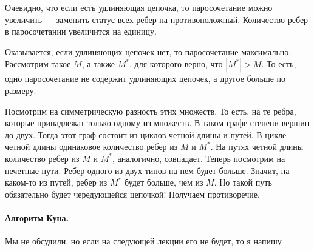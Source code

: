 \documentclass[12pt]{article}
\begin{document}
Очевидно, что если есть удлиняющая цепочка, то паросочетание можно увеличить --- заменить статус всех ребер на противоположный. Количество ребер в паросочетании увеличится на единицу.

Оказывается, если удлиняющих цепочек нет, то паросочетание максимально. Рассмотрим такое $M$, а также $M^*$, для которого верно, что $|M^*| > M$. То есть, одно паросочетание не содержит удлиняющих цепочек, а другое больше по размеру.

Посмотрим на симметрическую разность этих множеств. То есть, на те ребра, которые принадлежат только одному из множеств. В таком графе степени вершин до двух. Тогда этот граф состоит из циклов четной длины и путей. В цикле четной длины одинаковое количество ребер из $M$ и $M^*$. На путях четной длины количество ребер из $M$ и $M^*$, аналогично, совпадает. Теперь посмотрим на нечетные пути. Ребер одного из двух типов на нем будет больше. Значит, на каком-то из путей, ребер из $M^*$ будет больше, чем из $M$. Но такой путь обязательно будет чередующейся цепочкой! Получаем противоречие.

\paragraph{Алгоритм Куна.} Мы не обсудили, но если на следующей лекции его не будет, то я напишу
\end{document}
